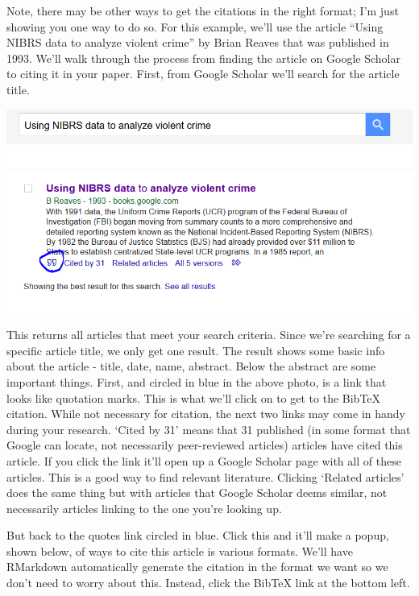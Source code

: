 \documentclass[
]{krantz}
\begin{document}
Note, there may be other ways to get the citations in the right format; I'm just showing you one way to do so. For this example, we'll use the article ``Using NIBRS data to analyze violent crime'' by Brian Reaves that was published in 1993. We'll walk through the process from finding the article on Google Scholar to citing it in your paper. First, from Google Scholar we'll search for the article title.

\includegraphics{images/citation_google_scholar.PNG}

This returns all articles that meet your search criteria. Since we're searching for a specific article title, we only get one result. The result shows some basic info about the article - title, date, name, abstract. Below the abstract are some important things. First, and circled in blue in the above photo, is a link that looks like quotation marks. This is what we'll click on to get to the BibTeX citation. While not necessary for citation, the next two links may come in handy during your research. `Cited by 31' means that 31 published (in some format that Google can locate, not necessarily peer-reviewed articles) articles have cited this article. If you click the link it'll open up a Google Scholar page with all of these articles. This is a good way to find relevant literature. Clicking `Related articles' does the same thing but with articles that Google Scholar deems similar, not necessarily articles linking to the one you're looking up.

But back to the quotes link circled in blue. Click this and it'll make a popup, shown below, of ways to cite this article is various formats. We'll have RMarkdown automatically generate the citation in the format we want so we don't need to worry about this. Instead, click the BibTeX link at the bottom left.
\end{document}
